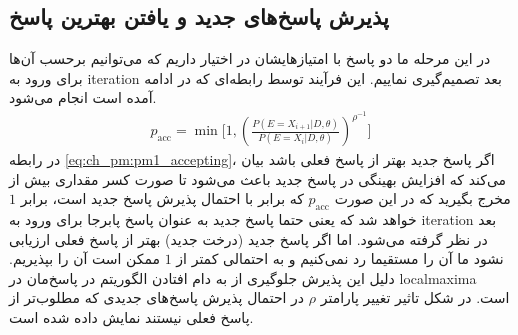 \subsection{پذیرش پاسخ‌های جدید و یافتن بهترین پاسخ}
در این مرحله ما دو پاسخ با امتیازهایشان در اختیار داریم که می‌توانیم برحسب آن‌ها برای ورود به \gls{iteration} بعد تصمیم‌گیری نماییم. این فرآیند توسط رابطه‌ای که در ادامه آمده است انجام می‌شود.
\begin{eqnarray}
	p_{\text{acc}} = \min\Bigg[1, \left(\frac{P(E=X_{i+1}|D, \theta)}{P(E=X_{i}|D, \theta)}\right)^{\rho^{-1}}\Bigg]
	 \label{eq:ch_pm:pm1_accepting} 
\end{eqnarray}
در رابطه \ref{eq:ch_pm:pm1_accepting}، اگر پاسخ جدید بهتر از پاسخ فعلی باشد بیان می‌کند که افزایش بهینگی در پاسخ جدید باعث می‌شود تا صورت کسر مقداری بیش از مخرج بگیرید که در این صورت $p_{\text{acc}}$ که برابر با احتمال پذیرش پاسخ جدید است، برابر $1$ خواهد شد که یعنی حتما پاسخ جدید به عنوان پاسخ پابرجا برای ورود به \gls{iteration} بعد در نظر گرفته می‌شود. اما اگر پاسخ جدید (درخت جدید) بهتر از پاسخ فعلی ارزیابی نشود ما آن را مستقیما رد نمی‌کنیم و به احتمالی کمتر از $1$ ممکن است آن را بپذیریم. دلیل این پذیرش جلوگیری از به دام افتادن الگوریتم در پاسخ‌مان در \gls{localmaxima} است. در شکل \label{fig:ch_pm:pm1_rho} تاثیر تغییر پارامتر $\rho$ در احتمال پذیرش پاسخ‌های جدیدی که مطلوب‌تر از پاسخ فعلی نیستند نمایش داده شده است.
